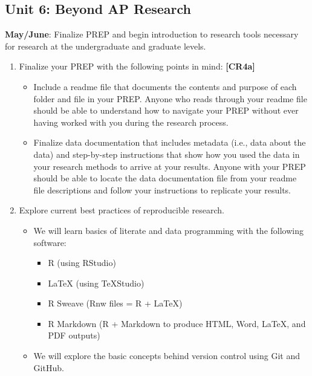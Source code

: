 \documentclass[11pt,]{article}
\providecommand{\tightlist}{%
  \setlength{\itemsep}{0pt}\setlength{\parskip}{0pt}}
\begin{document}
\hypertarget{unit-6-beyond-ap-research}{%
\subsection{Unit 6: Beyond AP Research}\label{unit-6-beyond-ap-research}}

\textbf{May/June}: Finalize PREP and begin introduction to research tools necessary for research at the undergraduate and graduate levels.

\begin{enumerate}
\def\labelenumi{\arabic{enumi}.}
\item
  Finalize your PREP with the following points in mind: \textbf{{[}CR4a{]}} 

  \begin{itemize}
  \item
    Include a readme file that documents the contents and purpose of each folder and file in your PREP. Anyone who reads through your readme file should be able to understand how to navigate your PREP without ever having worked with you during the research process.
  \item
    Finalize data documentation that includes metadata (i.e., data about the data) and step-by-step instructions that show how you used the data in your research methods to arrive at your results. Anyone with your PREP should be able to locate the data documentation file from your readme file descriptions and follow your instructions to replicate your results.
  \end{itemize}
\item
  Explore current best practices of reproducible research.

  \begin{itemize}
  \tightlist
  \item
    We will learn basics of literate and data programming with the following software:

    \begin{itemize}
    \tightlist
    \item
      R (using RStudio)
    \item
      LaTeX (using TeXStudio)
    \item
      R Sweave (Rnw files = R + LaTeX)
    \item
      R Markdown (R + Markdown to produce HTML, Word, LaTeX, and PDF outputs)
    \end{itemize}
  \item
    We will explore the basic concepts behind version control using Git and GitHub.


\end{itemize}
\end{enumerate}
\end{document}
